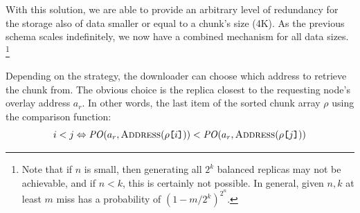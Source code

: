 \documentclass[manuscript,screen,review]{acmart}
\newcommand{\idx}[1]{\texttt{[}\/#1\/\texttt{]}}
\begin{document}
With this solution, we are able to provide an arbitrary level of redundancy for the storage also of data smaller or equal to a chunk's size (4K). As the previous schema scales indefinitely, we now have a combined mechanism for all data sizes.
%
%
\footnote{Note that if $n$ is small, then generating all $2^k$ balanced replicas may not be achievable, and if $n<k$, this is certainly not possible.
In general, given $n, k$ at least $m$ miss has a probability of $(1 - m/2^k)^{2^n}$.}

Depending on the strategy, the downloader can choose which  address to retrieve the chunk from. The obvious choice is the replica closest to the requesting node's overlay address $a_r$. In other words, the last item of the sorted chunk array $\rho$ using the comparison function:
\begin{equation}
  i<j\Leftrightarrow    	
  \mathit{PO}(a_r,
  \textsc{Address}(\rho\idx{i}))
  <\mathit{PO}(a_r,
  \textsc{Address}(\rho\idx{j}))
\end{equation}


\end{document}
